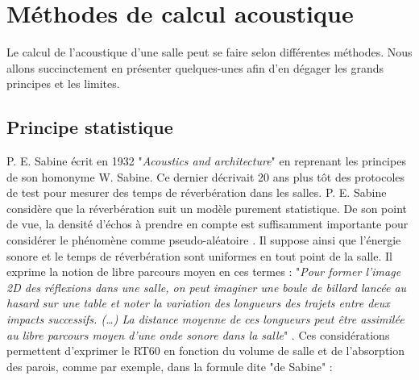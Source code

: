 \section{Méthodes de calcul acoustique} 
Le calcul de l'acoustique d'une salle peut se faire selon différentes méthodes. Nous allons succinctement en présenter quelques-unes afin d'en dégager les grands principes et les limites.

	\subsection{Principe statistique} \label{sect_sabine}

P. E. Sabine écrit en 1932 "\textit{Acoustics and architecture}" \cite{sabine2} en reprenant les principes de son homonyme W. Sabine. Ce dernier décrivait 20 ans plus tôt des protocoles de test pour mesurer des temps de réverbération dans les salles. P. E. Sabine considère que la réverbération suit un modèle purement statistique. De son point de vue, la densité d'échos à prendre en compte est suffisamment importante pour considérer le phénomène comme pseudo-aléatoire \cite[p. 19]{Kandelman}. Il suppose ainsi que l’énergie sonore et le temps de réverbération sont uniformes en tout point de la salle. Il exprime la notion de libre parcours moyen en ces termes : "\textit{Pour former l’image 2D des réflexions dans une salle, on peut imaginer une boule de billard lancée au hasard sur une table et noter la variation des longueurs des trajets entre deux impacts successifs. (…) La distance moyenne de ces longueurs peut être assimilée au libre parcours moyen d’une onde sonore dans la salle}" \cite[p. 22]{Kandelman}. Ces considérations permettent d'exprimer le \gls{RT60} en fonction du volume de salle et de l'absorption des parois, comme par exemple, dans la formule dite "de Sabine" \cite[p. 71-81]{jouhaneau}: 

